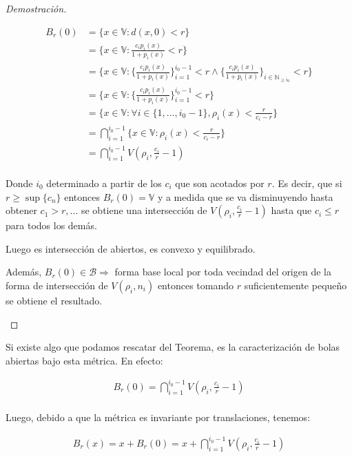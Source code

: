 \begin{proof}[Demostración]
\begin{enumerate}
\begin{enumerate}
			\begin{align*}
				B_r(0) &= \{ x \in \mathbb{V}: d(x,0) < r \}\\
				&= \{ x \in \mathbb{V}: \frac{c_i p_i(x)}{1+p_i(x)} < r\}\\
				&= \{ x \in \mathbb{V}: \{\frac{c_i p_i(x)}{1+p_i(x)}\}_{i = 1}^{i_0-1} < r \land  \{\frac{c_i p_i(x)}{1+p_i(x)}\}_{i \in \mathbb{N}_{\geq i_0}} < r\}\\
				&= \{ x \in \mathbb{V}: \{\frac{c_i p_i(x)}{1+p_i(x)}\}_{i = 1}^{i_0-1} < r\}\\
				&= \{ x \in \mathbb{V}: \forall i \in \{1,\dots , i_0-1\}, \rho_i(x) < \frac{r}{c_i - r}\}\\
				&=\bigcap_{i = 1}^{i_0 - 1} \{ x \in \mathbb{V}: \rho_i(x) < \frac{r}{c_i - r}\}\\
				&=\bigcap_{i = 1}^{i_0 - 1} V(\rho_i, \frac{c_i}{r} - 1)\\
			\end{align*} 
			
			Donde $i_0$ determinado a partir de los $c_i$ que son acotados por $r$. Es decir, que si $r\geq \sup\{c_n\}$ entonces $B_r(0) = \mathbb{V}$ y a medida que se va disminuyendo hasta obtener $c_1 > r, \dots$ se obtiene una intersección de $V(\rho_i, \frac{c_i}{r} - 1)$ hasta que $c_i \leq r$ para todos los demás.
			
			Luego es intersección de abiertos, es convexo y equilibrado.
			
			Además, $B_r(0) \in \mathcal{B} \Rightarrow$ forma base local por toda vecindad del origen de la forma de intersección de $V(\rho_i,n_i)$ entonces tomando $r$ suficientemente pequeño se obtiene el resultado.
		\end{enumerate}
	\end{enumerate}
\end{proof}

\begin{rmrk}
	Si existe algo que podamos rescatar del Teorema, es la caracterización de bolas abiertas bajo esta métrica. En efecto: 
	
	\begin{align*}
		B_r(0) =\bigcap_{i = 1}^{i_0 - 1} V(\rho_i, \frac{c_i}{r} - 1)\\
	\end{align*} 
	
	Luego, debido a que la métrica es invariante por translaciones, tenemos: 
	
	\begin{align*}
		B_r(x) = x + B_r(0) = x + \bigcap_{i = 1}^{i_0 - 1} V(\rho_i, \frac{c_i}{r} - 1)\\
	\end{align*} 
\end{rmrk}

